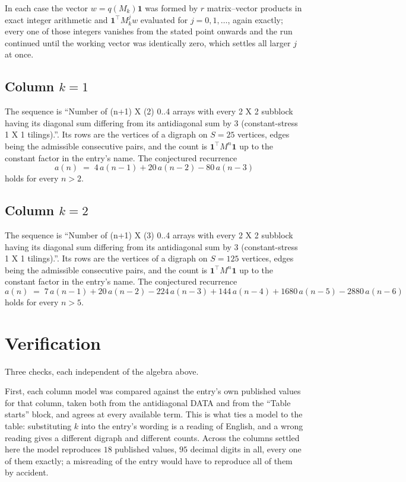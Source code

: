\documentclass[11pt,a4paper]{article}
\theoremstyle{plain}
\theoremstyle{definition}
\begin{document}
In each case the vector $w=q(M_k)\mathbf{1}$ was formed by $r$ matrix--vector products in
exact integer arithmetic and $\mathbf{1}^{\!\top}M_k^{j}w$ evaluated for $j=0,1,\dots$,
again exactly; every one of those integers vanishes from the stated point onwards and the run
continued until the working vector was identically zero, which settles all larger $j$ at once.

\subsection*{Column $k=1$}
The sequence is ``Number of (n+1) X (2) 0..4 arrays with every 2 X 2 subblock having its diagonal sum differing from its antidiagonal sum by 3 (constant-stress 1 X 1 tilings).''. Its rows are the vertices of a digraph on
$S=25$ vertices, edges being the admissible consecutive pairs, and the count is
$\mathbf{1}^{\!\top}M^{n}\mathbf{1}$ up to the constant factor in the entry's name.
The conjectured recurrence
\[
a(n)\;=\;4\,a(n-1) + 20\,a(n-2) - 80\,a(n-3)
\]
holds for every $n>2$.

\subsection*{Column $k=2$}
The sequence is ``Number of (n+1) X (3) 0..4 arrays with every 2 X 2 subblock having its diagonal sum differing from its antidiagonal sum by 3 (constant-stress 1 X 1 tilings).''. Its rows are the vertices of a digraph on
$S=125$ vertices, edges being the admissible consecutive pairs, and the count is
$\mathbf{1}^{\!\top}M^{n}\mathbf{1}$ up to the constant factor in the entry's name.
The conjectured recurrence
\[
a(n)\;=\;7\,a(n-1) + 20\,a(n-2) - 224\,a(n-3) + 144\,a(n-4) + 1680\,a(n-5) - 2880\,a(n-6)
\]
holds for every $n>5$.

\section{Verification}

Three checks, each independent of the algebra above.

First, each column model was compared against the entry's own published values for that
column, taken both from the antidiagonal DATA and from the ``Table starts'' block, and agrees
at every available term. This is what ties a model to the table: substituting $k$ into the
entry's wording is a reading of English, and a wrong reading gives a different digraph and
different counts. Across the columns settled here the model reproduces $18$ published
values, $95$ decimal digits in all, every one of them exactly; a misreading of the entry
would have to reproduce all of them by accident.
\end{document}
